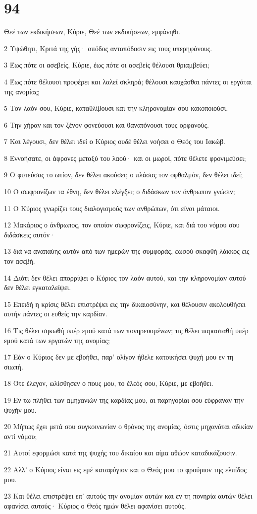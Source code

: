 \chapter{94}

\par Θεέ των εκδικήσεων, Κύριε, Θεέ των εκδικήσεων, εμφάνηθι.
\par 2 Υψώθητι, Κριτά της γής· απόδος ανταπόδοσιν εις τους υπερηφάνους.
\par 3 Έως πότε οι ασεβείς, Κύριε, έως πότε οι ασεβείς θέλουσι θριαμβεύει;
\par 4 Έως πότε θέλουσι προφέρει και λαλεί σκληρά; θέλουσι καυχάσθαι πάντες οι εργάται της ανομίας;
\par 5 Τον λαόν σου, Κύριε, καταθλίβουσι και την κληρονομίαν σου κακοποιούσι.
\par 6 Την χήραν και τον ξένον φονεύουσι και θανατόνουσι τους ορφανούς.
\par 7 Και λέγουσι, δεν θέλει ιδεί ο Κύριος ουδέ θέλει νοήσει ο Θεός του Ιακώβ.
\par 8 Εννοήσατε, οι άφρονες μεταξύ του λαού· και οι μωροί, πότε θέλετε φρονιμεύσει;
\par 9 Ο φυτεύσας το ωτίον, δεν θέλει ακούσει; ο πλάσας τον οφθαλμόν, δεν θέλει ιδεί;
\par 10 Ο σωφρονίζων τα έθνη, δεν θέλει ελέγξει; ο διδάσκων τον άνθρωπον γνώσιν;
\par 11 Ο Κύριος γνωρίζει τους διαλογισμούς των ανθρώπων, ότι είναι μάταιοι.
\par 12 Μακάριος ο άνθρωπος, τον οποίον σωφρονίζεις, Κύριε, και διά του νόμου σου διδάσκεις αυτόν·
\par 13 διά να αναπαύης αυτόν από των ημερών της συμφοράς, εωσού σκαφθή λάκκος εις τον ασεβή.
\par 14 Διότι δεν θέλει απορρίψει ο Κύριος τον λαόν αυτού, και την κληρονομίαν αυτού δεν θέλει εγκαταλείψει.
\par 15 Επειδή η κρίσις θέλει επιστρέψει εις την δικαιοσύνην, και θέλουσιν ακολουθήσει αυτήν πάντες οι ευθείς την καρδίαν.
\par 16 Τις θέλει σηκωθή υπέρ εμού κατά των πονηρευομένων; τις θέλει παρασταθή υπέρ εμού κατά των εργατών της ανομίας;
\par 17 Εάν ο Κύριος δεν με εβοήθει, παρ' ολίγον ήθελε κατοικήσει ψυχή μου εν τη σιωπή.
\par 18 Ότε έλεγον, ωλίσθησεν ο πους μου, το έλεός σου, Κύριε, με εβοήθει.
\par 19 Εν τω πλήθει των αμηχανιών της καρδίας μου, αι παρηγορίαι σου εύφραναν την ψυχήν μου.
\par 20 Μήπως έχει μετά σου συγκοινωνίαν ο θρόνος της ανομίας, όστις μηχανάται αδικίαν αντί νόμου;
\par 21 Αυτοί εφορμώσι κατά της ψυχής του δικαίου και αίμα αθώον καταδικάζουσιν.
\par 22 Αλλ' ο Κύριος είναι εις εμέ καταφύγιον και ο Θεός μου το φρούριον της ελπίδος μου.
\par 23 Και θέλει επιστρέψει επ' αυτούς την ανομίαν αυτών και εν τη πονηρία αυτών θέλει αφανίσει αυτούς· Κύριος ο Θεός ημών θέλει αφανίσει αυτούς.

